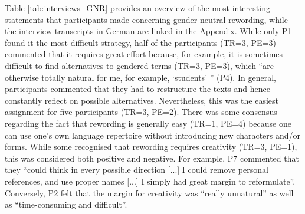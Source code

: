 Table \ref{tab:interviews_GNR} provides an overview of the most interesting statements that participants made concerning gender-neutral rewording, while the interview transcripts in German are linked in the Appendix. While only P1 found it the most difficult strategy, half of the participants (TR=3, PE=3) commented that it requires great effort because, for example, it is sometimes difficult to find alternatives to gendered terms (TR=3, PE=3), which ``are otherwise totally natural for me, for example, `students' '' (P4). In general, participants commented that they had to restructure the texts and hence constantly reflect on possible alternatives. Nevertheless, this was the easiest assignment for five participants (TR=3, PE=2). There was some consensus regarding the fact that rewording is generally easy (TR=1, PE=4) because one can use one's own language repertoire without introducing new characters and/or forms. While some recognised that rewording requires creativity (TR=3, PE=1), this was considered both positive and negative. For example, P7 commented that they ``could think in every possible direction [...] I could remove personal references, and use proper names [...] I simply had great margin to reformulate''. Conversely, P2 felt that the margin for creativity was ``really unnatural'' as well as ``time-consuming and difficult''. 

